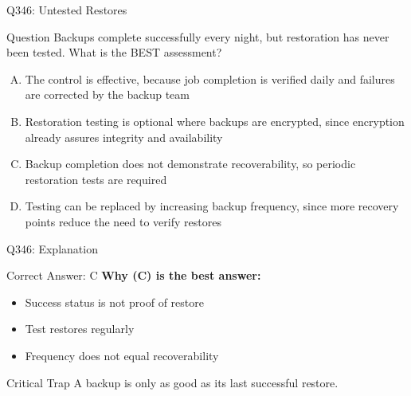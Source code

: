 \documentclass{beamer}
\begin{document}
	\begin{frame}{Q346: Untested Restores}
		\begin{block}{Question}
			\small Backups complete successfully every night, but restoration has never been tested. What is the BEST assessment?
		\end{block}
		\begin{enumerate}[(A)]
			\footnotesize
			\item The control is effective, because job completion is verified daily and failures are corrected by the backup team
			\item Restoration testing is optional where backups are encrypted, since encryption already assures integrity and availability
			\item Backup completion does not demonstrate recoverability, so periodic restoration tests are required
			\item Testing can be replaced by increasing backup frequency, since more recovery points reduce the need to verify restores
		\end{enumerate}
	\end{frame}
	
	\begin{frame}{Q346: Explanation}
		\begin{block}{Correct Answer: C}
			\textbf{Why (C) is the best answer:}
			\begin{itemize}
				\item Success status is not proof of restore
				\item Test restores regularly
				\item Frequency does not equal recoverability
			\end{itemize}
		\end{block}
		\begin{alertblock}{Critical Trap}
			A backup is only as good as its last successful restore.
		\end{alertblock}
	\end{frame}
	
\end{document}
